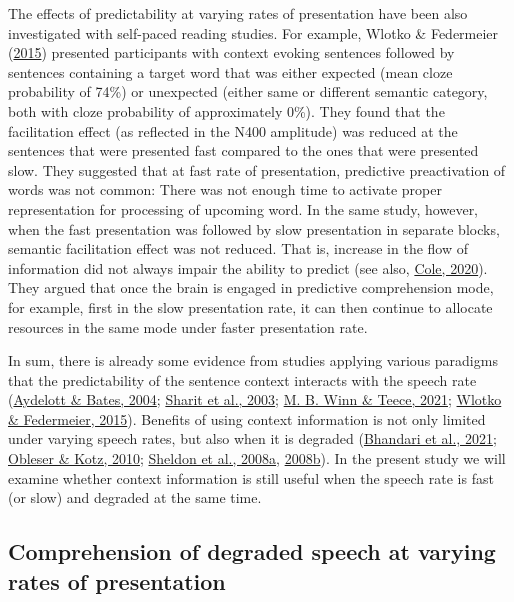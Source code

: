 \documentclass[a4paper, nobind]{templates/ociamthesis}
\begin{document}
The effects of predictability at varying rates of presentation have been also investigated with self-paced reading studies.
For example, Wlotko \& Federmeier (\protect\hyperlink{ref-Wlotko2015}{2015}) presented participants with context evoking sentences followed by sentences containing a target word that was either expected (mean cloze probability of 74\%) or unexpected (either same or different semantic category, both with cloze probability of approximately 0\%).
They found that the facilitation effect (as reflected in the N400 amplitude) was reduced at the sentences that were presented fast compared to the ones that were presented slow.
They suggested that at fast rate of presentation, predictive preactivation of words was not common: There was not enough time to activate proper representation for processing of upcoming word.
In the same study, however, when the fast presentation was followed by slow presentation in separate blocks, semantic facilitation effect was not reduced.
That is, increase in the flow of information did not always impair the ability to predict (see also, \protect\hyperlink{ref-Cole2020}{Cole, 2020}).
They argued that once the brain is engaged in predictive comprehension mode, for example, first in the slow presentation rate, it can then continue to allocate resources in the same mode under faster presentation rate.

In sum, there is already some evidence from studies applying various paradigms that the predictability of the sentence context interacts with the speech rate (\protect\hyperlink{ref-Aydelott2004}{Aydelott \& Bates, 2004}; \protect\hyperlink{ref-Sharit2003}{Sharit et al., 2003}; \protect\hyperlink{ref-Winn2021b}{M. B. Winn \& Teece, 2021}; \protect\hyperlink{ref-Wlotko2015}{Wlotko \& Federmeier, 2015}).
Benefits of using context information is not only limited under varying speech rates, but also when it is degraded (\protect\hyperlink{ref-Bhandari2021}{Bhandari et al., 2021}; \protect\hyperlink{ref-Obleser2010}{Obleser \& Kotz, 2010}; \protect\hyperlink{ref-Sheldon2008a}{Sheldon et al., 2008a}, \protect\hyperlink{ref-Sheldon2008b}{2008b}).
In the present study we will examine whether context information is still useful when the speech rate is fast (or slow) and degraded at the same time.

\hypertarget{comprehension-of-degraded-speech-at-varying-rates-of-presentation}{%
\subsection{Comprehension of degraded speech at varying rates of presentation}\label{comprehension-of-degraded-speech-at-varying-rates-of-presentation}}
\end{document}
